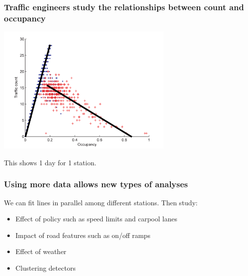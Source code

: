 \documentclass{beamer}
\begin{document}
\begin{frame}

    \frametitle{Traffic engineers study the relationships between count and
    occupancy}

\centerline{\includegraphics[height=2.5in]{fundamental_diagram.png}}

This shows 1 day for 1 station.

\end{frame}
\begin{frame}

    \frametitle{Using more data allows new types of analyses}


We can fit lines in parallel among different stations. Then study:

    \begin{itemize}
        \item Effect of policy such as speed limits and carpool lanes
        \item Impact of road features such as on/off ramps
        \item Effect of weather
        \item Clustering detectors
    \end{itemize}

\end{frame}
\end{document}
